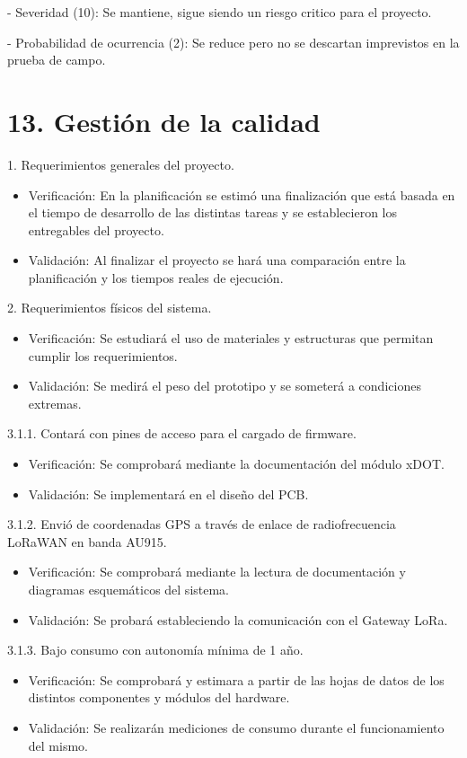 \documentclass[11pt]{charter}
\begin{document}
	- Severidad (10): Se mantiene, sigue siendo un riesgo critico para el proyecto.  
	
	- Probabilidad de ocurrencia (2): Se reduce pero no se descartan imprevistos en la prueba de campo. 
	
\section{13. Gestión de la calidad}
\label{sec:calidad}

1. Requerimientos generales del proyecto.
\begin{itemize}
	\item Verificación: En la planificación se estimó una finalización que está basada en el tiempo de desarrollo de las distintas tareas y se establecieron los entregables del proyecto.
	\item Validación: Al finalizar el proyecto se hará una comparación entre la planificación y los tiempos reales de ejecución. 
\end{itemize}

2. Requerimientos físicos del sistema.
\begin{itemize}
	\item Verificación: Se estudiará el uso de materiales y estructuras que permitan cumplir los requerimientos.  
	\item Validación: Se medirá el peso del prototipo y se someterá a condiciones extremas. 
\end{itemize}

3.1.1. Contará con pines de acceso para el cargado de firmware.
\begin{itemize}
	\item Verificación: Se comprobará mediante la documentación del módulo xDOT. 
	\item Validación: Se implementará en el diseño del PCB. 
\end{itemize}

3.1.2. Envió de coordenadas GPS a través de enlace de radiofrecuencia LoRaWAN en banda AU915.
\begin{itemize}
	\item Verificación: Se comprobará mediante la lectura de documentación y diagramas esquemáticos del sistema. 
	\item Validación: Se probará estableciendo la comunicación con el Gateway LoRa.  
\end{itemize}

3.1.3. Bajo consumo con autonomía mínima de 1 año.
\begin{itemize}
	\item Verificación: Se comprobará y estimara a partir de las hojas de datos de los distintos componentes y módulos del hardware. 
	\item Validación: Se realizarán mediciones de consumo durante el funcionamiento del mismo. 
\end{itemize}
\end{document}
